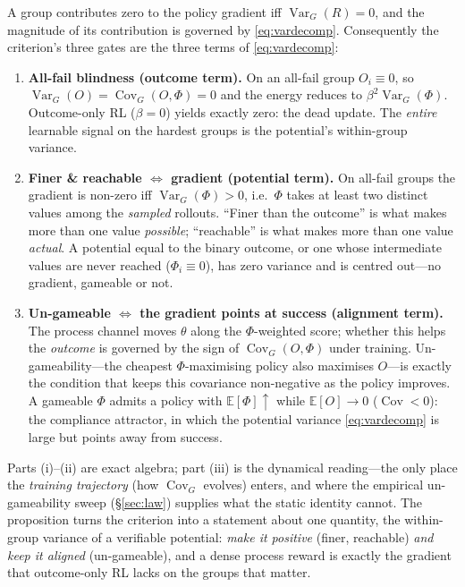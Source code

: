 \begin{proposition}
\label{prop:variance}
A group contributes zero to the policy gradient iff $\operatorname{Var}_G(R)=0$, and the
magnitude of its contribution is governed by \eqref{eq:vardecomp}. Consequently the
criterion's three gates are the three terms of \eqref{eq:vardecomp}:
\begin{enumerate}[leftmargin=1.6em,itemsep=1pt,topsep=2pt,label=\textnormal{(\roman*)}]
\item \textbf{All-fail blindness (outcome term).} On an all-fail group $O_i\equiv 0$, so
$\operatorname{Var}_G(O)=\operatorname{Cov}_G(O,\Phi)=0$ and the energy reduces to
$\beta^2\operatorname{Var}_G(\Phi)$. Outcome-only RL ($\beta=0$) yields exactly zero: the
dead update. The \emph{entire} learnable signal on the hardest groups is the potential's
within-group variance.
\item \textbf{Finer \& reachable $\Leftrightarrow$ gradient (potential term).} On all-fail
groups the gradient is non-zero iff $\operatorname{Var}_G(\Phi)>0$, i.e.\ $\Phi$ takes at
least two distinct values among the \emph{sampled} rollouts. ``Finer than the outcome''
is what makes more than one value \emph{possible}; ``reachable'' is what makes more than
one value \emph{actual}. A potential equal to the binary outcome, or one whose intermediate
values are never reached ($\Phi_i\equiv 0$), has zero variance and is centred out---no
gradient, gameable or not.
\item \textbf{Un-gameable $\Leftrightarrow$ the gradient points at success (alignment
term).} The process channel moves $\theta$ along the $\Phi$-weighted score; whether this
helps the \emph{outcome} is governed by the sign of $\operatorname{Cov}_G(O,\Phi)$ under
training. Un-gameability---the cheapest $\Phi$-maximising policy also maximises $O$---is
exactly the condition that keeps this covariance non-negative as the policy improves. A
gameable $\Phi$ admits a policy with $\mathbb{E}[\Phi]\!\uparrow$ while
$\mathbb{E}[O]\!\to\!0$ ($\operatorname{Cov}<0$): the compliance attractor, in which the
potential variance \eqref{eq:vardecomp} is large but points away from success.
\end{enumerate}
\end{proposition}

Parts (i)--(ii) are exact algebra; part (iii) is the dynamical reading---the only place the
\emph{training trajectory} (how $\operatorname{Cov}_G$ evolves) enters, and where the
empirical un-gameability sweep (\S\ref{sec:law}) supplies what the static identity cannot.
The proposition turns the criterion into a statement about one quantity, the within-group
variance of a verifiable potential: \emph{make it positive} (finer, reachable) \emph{and
keep it aligned} (un-gameable), and a dense process reward is exactly the gradient that
outcome-only RL lacks on the groups that matter.
